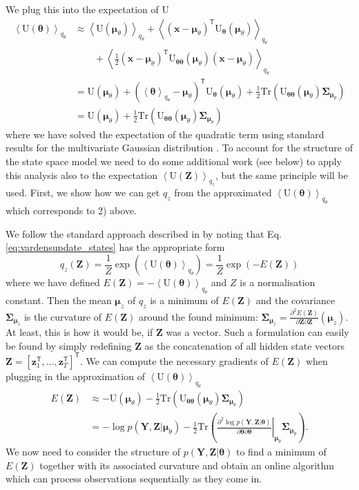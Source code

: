 \documentclass[a4paper,10pt]{article}
\newcommand{\bs}[1]{\mathbf{#1}}					%
\newcommand{\bgs}[1]{\boldsymbol{#1}}				%
\newcommand{\ppd}[3]{\frac{\partial^2 #1}{\partial #2 \partial #3}} %
\newcommand{\tr}{\mathsf{T}}				%
\newcommand{\eq}[1]{\begin{equation} #1 \end{equation}}%
\newcommand{\trace}[1]{\mathrm{Tr}\left(#1\right)}					%
\renewcommand{\ss}{z}         %
\newcommand{\sh}{x}         %
\newcommand{\spm}{\mu}    %
\renewcommand{\sp}{\theta}    %
\newcommand{\ps}{\bs{\ss}}    %
\newcommand{\ph}{\bs{\sh}}    %
\newcommand{\ppm}{\bgs{\spm}}   %
\newcommand{\pp}{\bgs{\sp}} %
\newcommand{\Ps}{\bs{Z}}    %
\newcommand{\Po}{\bs{Y}}    %
\newcommand{\E}[2][]{\left\langle #2 \right\rangle_{#1}}	%
\newcommand{\U}{\mathrm{U}}			%
\newcommand{\Cov}{\bgs{\Sigma}}			%
\begin{document}
We plug this into the expectation of $\U$
\begin{align}
    \E[q_\sp]{\U(\pp)} &\approx 
            \E[q_\sp]{\U(\ppm_\sp)} + \E[q_\sp]{(\ph - \ppm_\sp)^\tr \U_{\pp}(\ppm_\sp)}\nonumber\\
               & \qquad + \E[q_\sp]{\frac{1}{2}(\ph - \ppm_\sp)^\tr \U_{\pp\pp}(\ppm_\sp) (\ph - \ppm_\sp)}\\
        &= \U(\ppm_\sp) + \left(\E[q_\sp]{\pp} - \ppm_\sp\right)^\tr \U_{\pp}(\ppm_\sp) + \frac{1}{2}\trace{\U_{\pp\pp}(\ppm_\sp)\Cov_{\ppm_\sp}}\\
        &= \U(\ppm_\sp) + \frac{1}{2}\trace{\U_{\pp\pp}(\ppm_\sp)\Cov_{\ppm_\sp}}
\end{align}
where we have solved the expectation of the quadratic term using standard results for the multivariate Gaussian distribution \citep[][eq. (357)]{Petersen2008}. To account for the structure of the state space model we need to do some additional work (see below) to apply this analysis also to the expectation $\E[q_\ss]{\U(\Ps)}$, but the same principle will be used. First, we show how we can get $q_\ss$ from the approximated $\E[q_\sp]{\U(\pp)}$ which corresponds to 2) above.

We follow the standard approach described in \cite[p. 255]{Murphy2012} by noting that Eq. \ref{eq:vardensupdate_states} has the appropriate form
\eq{
    q_{\ss}(\Ps) = \frac{1}{Z}\exp\left(\E[q_\sp]{\U(\pp)}\right) = \frac{1}{Z}\exp\left(-E(\Ps)\right)
}
where we have defined $E(\Ps) = -\E[q_\sp]{\U(\pp)}$ and $Z$ is a normalisation constant. Then the mean $\ppm_\ss$ of $q_\ss$ is a minimum of $E(\Ps)$ and the covariance $\Cov_{\ppm_\ss}$ is the curvature of $E(\Ps)$ around the found minimum: $\Cov_{\ppm_\ss} = \ppd{E(\Ps)}{\Ps}{\Ps}(\ppm_\ss)$. At least, this is how it would be, if $\Ps$ was a vector. Such a formulation can easily be found by simply redefining $\Ps$ as the concatenation of all hidden state vectors $\Ps = [\ps_1^\tr, \dots, \ps_T^\tr]^\tr$. We can compute the necessary gradients of $E(\Ps)$ when plugging in the approximation of $\E[q_\sp]{\U(\pp)}$
\begin{align}
    E(\Ps) &\approx - \U(\ppm_\sp) - \frac{1}{2}\trace{\U_{\pp\pp}(\ppm_\sp)\Cov_{\ppm_\sp}}\\
    \label{eq:stateenergy} &= - \log p(\Po,\Ps|\ppm_\sp) - \frac{1}{2}\trace{\left.\ppd{\log p(\Po,\Ps|\pp)}{\pp}{\pp}\right|_{\ppm_\sp}\Cov_{\ppm_\sp}}.
\end{align}
We now need to consider the structure of $p(\Po,\Ps|\pp)$ to find a minimum of $E(\Ps)$ together with its associated curvature and obtain an online algorithm which can process observations sequentially as they come in.
\end{document}
